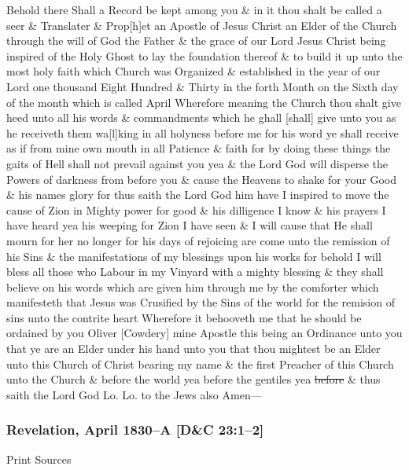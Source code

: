 				Behold there Shall a Record be kept among you \& in it thou shalt be called a seer \& Translater \& Prop[h]et an Apostle of Jesus Christ an Elder of the Church through the will of God the Father \& the grace of our Lord Jesus Christ being inspired of the Holy Ghost to lay the foundation thereof \& to build it up unto the most holy faith which Church was Organized \& established in the year of our Lord one thousand Eight Hundred \& Thirty in the forth Month on the Sixth day of the month which is called April Wherefore meaning the Church thou shalt give heed unto all his words \& commandments which he ghall [shall] give unto you as he receiveth them wa[l]king in all holyness before me for his word ye shall receive as if from mine own mouth in all Patience \& faith for by doing these things the gaits of Hell shall not prevail against you yea \& the Lord God will disperse the Powers of darkness from before you \& cause the Heavens to shake for your Good \& his names glory for thus saith the Lord God him have I inspired to move the cause of Zion in Mighty power for good \& his dilligence I know \& his prayers I have heard yea his weeping for Zion I have seen \& I will cause that He shall mourn for her no longer for his days of rejoicing are come unto the remission of his Sins \& the manifestations of my blessings upon his works for behold I will bless all those who Labour in my Vinyard with a mighty blessing \& they shall believe on his words which are given him through me by the comforter which manifesteth that Jesus was Crusified by the Sins of the world for the remision of sins unto the contrite heart Wherefore it behooveth me that he should be ordained by you Oliver [Cowdery] mine Apostle this being an Ordinance unto you that ye are an Elder under his hand unto you that thou mightest be an Elder unto this Church of Christ bearing my name \& the first Preacher of this Church unto the Church \& before the world yea before the gentiles yea \sout{before} \& thus saith the Lord God Lo. Lo. to the Jews also Amen---
				
		\subsubsection{Revelation, April 1830--A [D\&C 23:1--2]}
			\label{EMS-1830-JS-APR-1830-A}
		
			\begin{description}
				\item[Print Sources]
			\end{description}

